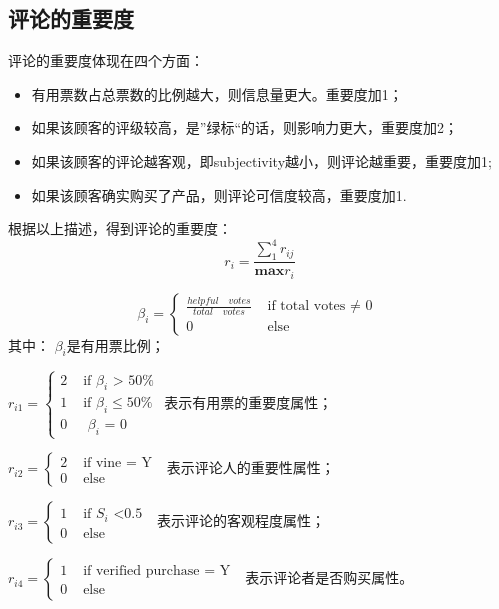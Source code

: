 \documentclass[UTF8]{article}
\begin{document}
\subsection{评论的重要度}
评论的重要度体现在四个方面：

\begin{itemize}
	\item 有用票数占总票数的比例越大，则信息量更大。重要度加1；
	\item 如果该顾客的评级较高，是”绿标“的话，则影响力更大，重要度加2；
	\item 如果该顾客的评论越客观，即subjectivity越小，则评论越重要，重要度加1;
	\item 如果该顾客确实购买了产品，则评论可信度较高，重要度加1.
\end{itemize}

根据以上描述，得到评论的重要度：
\begin{equation}
r_{i}=\frac{\sum_{1}^{4}r_{ij}}{\mathbf{max} r_i}
\end{equation}

\begin{equation}
\beta_i=\left\{\begin{array}{ll}
\frac{helpful\quad votes}{total\quad votes} & \text { if total votes $\neq$ 0 } \\
0 & \text { else } 
\end{array}\right.
\end{equation}
其中：
$\beta_i$是有用票比例；

$
r_{i1}=\left\{\begin{array}{ll}
2 & \text { if $\beta_i$ > 50\% } \\
1 & \text { if $\beta_i \leq $50\% } \\
0 & \text { $\beta_i$ = 0 } 
\end{array}\right.
$
表示有用票的重要度属性；


$
r_{i2}=\left\{\begin{array}{ll}
2 & \text { if vine = Y } \\
0 & \text { else } 
\end{array}\right.
$
表示评论人的重要性属性；

$
r_{i3}=\left\{\begin{array}{ll}
1 & \text { if $S_i$ <0.5  } \\
0 & \text { else } 
\end{array}\right.
$
表示评论的客观程度属性；

$
r_{i4}=\left\{\begin{array}{ll}
1 & \text { if verified purchase = Y } \\
0 & \text { else } 
\end{array}\right.
$
表示评论者是否购买属性。
\end{document}
